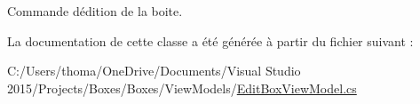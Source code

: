 Commande d\textquotesingle{}édition de la boite. 



La documentation de cette classe a été générée à partir du fichier suivant \+:\begin{DoxyCompactItemize}
\item 
C\+:/\+Users/thoma/\+One\+Drive/\+Documents/\+Visual Studio 2015/\+Projects/\+Boxes/\+Boxes/\+View\+Models/\hyperlink{_edit_box_view_model_8cs}{Edit\+Box\+View\+Model.\+cs}\end{DoxyCompactItemize}
